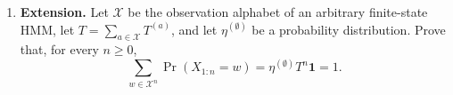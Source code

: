 \documentclass[11pt]{article}
\begin{document}
\begin{exercise}
\begin{enumerate}
\begin{enumerate}
        \item Form $T=T^{(0)}+T^{(1)}$ and verify that it is row-stochastic.

        \item Calculate $\Pr(X_{1:3}=011)$ and
          $\Pr(X_{1:3}=010)$ both by tracing paths through the diagram and by
          multiplying the appropriate symbol matrices. Explain how the second
          calculation reflects the defining constraint of the Even Process.
      \end{enumerate}

    \item \textbf{Extension.} Let $\mathcal X$ be the observation alphabet of
      an arbitrary finite-state HMM, let
      $T=\sum_{a\in\mathcal X}T^{(a)}$, and let
      $\eta^{(\emptyset)}$ be a probability distribution. Prove that, for
      every $n\geq 0$,
      \[
        \sum_{w\in\mathcal X^n}\Pr(X_{1:n}=w)
          =\eta^{(\emptyset)}T^n\mathbf 1
          =1.
      \]
  \end{enumerate}
\end{exercise}
\end{document}
